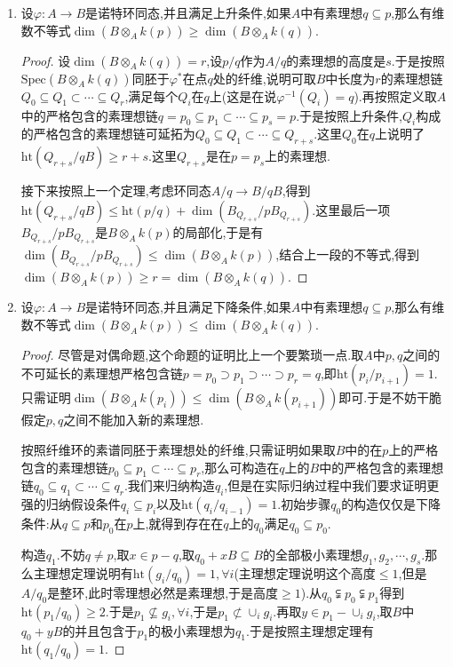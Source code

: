 \begin{enumerate}
	\item 设$\varphi:A\to B$是诺特环同态,并且满足上升条件,如果$A$中有素理想$q\subseteq p$,那么有维数不等式$\dim(B\otimes_Ak(p))\ge\dim(B\otimes_Ak(q))$.
	\begin{proof}
		
		设$\dim(B\otimes_Ak(q))=r$,设$p/q$作为$A/q$的素理想的高度是$s$.于是按照$\mathrm{Spec}(B\otimes_Ak(q))$同胚于$\varphi^*$在点$q$处的纤维,说明可取$B$中长度为$r$的素理想链$Q_0\subseteq Q_1\subset\cdots\subseteq Q_r$,满足每个$Q_i$在$q$上(这是在说$\varphi^{-1}(Q_i)=q$).再按照定义取$A$中的严格包含的素理想链$q=p_0\subseteq p_1\subset\cdots\subseteq p_s=p$.于是按照上升条件,$Q_i$构成的严格包含的素理想链可延拓为$Q_0\subseteq Q_1\subset\cdots\subseteq Q_{r+s}$.这里$Q_0$在$q$上说明了$\mathrm{ht}(Q_{r+s}/qB)\ge r+s$.这里$Q_{r+s}$是在$p=p_s$上的素理想.
		
		接下来按照上一个定理,考虑环同态$A/q\to B/qB$,得到$\mathrm{ht}(Q_{r+s}/qB)\le\mathrm{ht}(p/q)+\dim(B_{Q_{r+s}}/pB_{Q_{r+s}})$.这里最后一项$B_{Q_{r+s}}/pB_{Q_{r+s}}$是$B\otimes_Ak(p)$的局部化,于是有$\dim(B_{Q_{r+s}}/pB_{Q_{r+s}})\le\dim(B\otimes_Ak(p))$,结合上一段的不等式,得到$\dim(B\otimes_Ak(p))\ge r=\dim(B\otimes_Ak(q))$.
	\end{proof}
	\item 设$\varphi:A\to B$是诺特环同态,并且满足下降条件,如果$A$中有素理想$q\subseteq p$,那么有维数不等式$\dim(B\otimes_Ak(p))\le\dim(B\otimes_Ak(q))$.
	\begin{proof}
		
		尽管是对偶命题,这个命题的证明比上一个要繁琐一点.取$A$中$p,q$之间的不可延长的素理想严格包含链$p=p_0\supset p_1\supset\cdots\supset p_r=q$,即$\mathrm{ht}(p_i/p_{i+1})=1$.只需证明$\dim(B\otimes_Ak(p_i))\le\dim(B\otimes_Ak(p_{i+1}))$即可.于是不妨干脆假定$p,q$之间不能加入新的素理想.
		
		按照纤维环的素谱同胚于素理想处的纤维,只需证明如果取$B$中的在$p$上的严格包含的素理想链$p_0\subseteq p_1\subset\cdots\subseteq p_r$,那么可构造在$q$上的$B$中的严格包含的素理想链$q_0\subseteq q_1\subset\cdots\subseteq q_r$.我们来归纳构造$q_i$,但是在实际归纳过程中我们要求证明更强的归纳假设条件$q_i\subseteq p_i$以及$\mathrm{ht}(q_i/q_{i-1})=1$.初始步骤$q_0$的构造仅仅是下降条件:从$q\subseteq p$和$p_0$在$p$上,就得到存在在$q$上的$q_0$满足$q_0\subseteq p_0$.
		
		构造$q_1$.不妨$q\not=p$,取$x\in p-q$,取$q_0+xB\subseteq B$的全部极小素理想$g_1,g_2,\cdots,g_s$.那么主理想定理说明有$\mathrm{ht}(g_i/q_0)=1,\forall i$(主理想定理说明这个高度$\le1$,但是$A/q_0$是整环,此时零理想必然是素理想,于是高度$\ge1$).从$q_0\subsetneqq p_0\subsetneqq p_1$得到$\mathrm{ht}(p_1/q_0)\ge2$.于是$p_1\not\subseteq g_i,\forall i$,于是$p_1\not\subset\cup_ig_i$.再取$y\in p_1-\cup_ig_i$,取$B$中$q_0+yB$的并且包含于$p_1$的极小素理想为$q_1$.于是按照主理想定理有$\mathrm{ht}(q_1/q_0)=1$.
		

\end{proof}
\end{enumerate}
